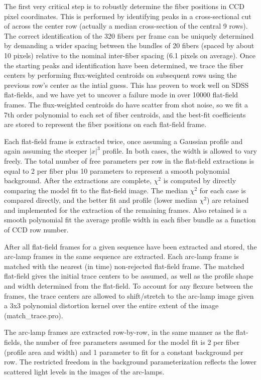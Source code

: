 \documentclass[12pt,preprint]{aastex}
\begin{document}
The first very critical step is to robustly determine the fiber positions 
in CCD pixel coordinates.
This is performed by identifying peaks in a cross-sectional cut of across 
the center row (actually a median cross-section of the central 9 rows).  
The correct identification of the 320 fibers per frame can be 
uniquely determined by demanding a wider spacing between the bundles 
of 20 fibers (spaced by about 10 pixels) relative to the nominal inter-fiber 
spacing (6.1 pixels on average).  Once the starting peaks and 
identification have been determined, we trace the fiber centers 
by performing flux-weighted centroids on subsequent rows
using the previous row's center as the intial guess.  This has proven to 
work well on SDSS flat-fields, and we have yet to uncover a failure 
mode in over 10000 flat-field frames.
The flux-weighted centroids do have scatter from shot noise, 
so we fit a 7th order polynomial to each set of fiber centroids, 
and the best-fit coefficients are stored to represent the fiber positions 
on each flat-field frame.


Each flat-field frame is extracted twice, once assuming a Gaussian
profile and again assuming the steeper $|x|^3$ profile.  In both cases,
the width is allowed to vary freely.  The total number of free parameters
per row in the flat-field extractions is equal to 2 per fiber plus 10
parameters to represent a smooth polynomial background.  After the extractions
are complete, $\chi^2$ is computed by directly comparing the model fit
to the flat-field image.  The median $\chi^2$ for each case is compared
directly, and the better fit and profile (lower median $\chi^2$) are retained
and implemented for the extraction of the remaining frames.  Also retained
is a smooth polynomial fit the average profile width in each fiber bundle
as a function of CCD row number.

After all flat-field frames for a given sequence have been extracted
and stored, the arc-lamp frames in the same sequence are extracted.  
Each arc-lamp frame is matched with the nearest (in time) 
non-rejected flat-field frame.  The matched flat-field gives the 
initial trace centers to
be assumed, as well as the profile shape and width determined from the
flat-field.  To account for any flexure between the frames, the trace
centers are allowed to shift/stretch to the arc-lamp image given a 
3x3 polynomial distortion kernel over the entire extent of the image
(match\_trace.pro).

The arc-lamp frames are extracted row-by-row, in the same
manner as the flat-fields, the number of free parameters assumed
for the model fit is 2 per fiber (profile area and width) and 1 parameter
to fit for a constant background per row.  The restricted freedom in the
background parameterization reflects the lower scattered light levels in
the images of the arc-lamps.
\end{document}
